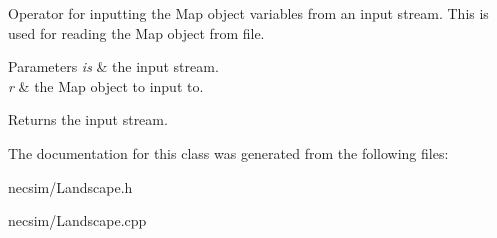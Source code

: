 Operator for inputting the Map object variables from an input stream. This is used for reading the Map object from file. 


\begin{DoxyParams}{Parameters}
{\em is} & the input stream. \\
\hline
{\em r} & the Map object to input to. \\
\hline
\end{DoxyParams}
\begin{DoxyReturn}{Returns}
the input stream. 
\end{DoxyReturn}


The documentation for this class was generated from the following files\+:\begin{DoxyCompactItemize}
\item 
necsim/Landscape.\+h\item 
necsim/Landscape.\+cpp\end{DoxyCompactItemize}
